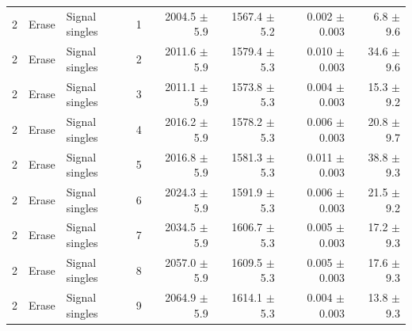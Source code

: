 \begin{tabular}{llllrrrr}
\midrule
2 & Erase & Signal singles & 1 & 2004.5 \ensuremath{\pm} 5.9 & 1567.4 \ensuremath{\pm} 5.2 & 0.002 \ensuremath{\pm} 0.003 & 6.8 \ensuremath{\pm} 9.6 \\
2 & Erase & Signal singles & 2 & 2011.6 \ensuremath{\pm} 5.9 & 1579.4 \ensuremath{\pm} 5.3 & 0.010 \ensuremath{\pm} 0.003 & 34.6 \ensuremath{\pm} 9.6 \\
2 & Erase & Signal singles & 3 & 2011.1 \ensuremath{\pm} 5.9 & 1573.8 \ensuremath{\pm} 5.3 & 0.004 \ensuremath{\pm} 0.003 & 15.3 \ensuremath{\pm} 9.2 \\
2 & Erase & Signal singles & 4 & 2016.2 \ensuremath{\pm} 5.9 & 1578.2 \ensuremath{\pm} 5.3 & 0.006 \ensuremath{\pm} 0.003 & 20.8 \ensuremath{\pm} 9.7 \\
2 & Erase & Signal singles & 5 & 2016.8 \ensuremath{\pm} 5.9 & 1581.3 \ensuremath{\pm} 5.3 & 0.011 \ensuremath{\pm} 0.003 & 38.8 \ensuremath{\pm} 9.3 \\
2 & Erase & Signal singles & 6 & 2024.3 \ensuremath{\pm} 5.9 & 1591.9 \ensuremath{\pm} 5.3 & 0.006 \ensuremath{\pm} 0.003 & 21.5 \ensuremath{\pm} 9.2 \\
2 & Erase & Signal singles & 7 & 2034.5 \ensuremath{\pm} 5.9 & 1606.7 \ensuremath{\pm} 5.3 & 0.005 \ensuremath{\pm} 0.003 & 17.2 \ensuremath{\pm} 9.3 \\
2 & Erase & Signal singles & 8 & 2057.0 \ensuremath{\pm} 5.9 & 1609.5 \ensuremath{\pm} 5.3 & 0.005 \ensuremath{\pm} 0.003 & 17.6 \ensuremath{\pm} 9.3 \\
2 & Erase & Signal singles & 9 & 2064.9 \ensuremath{\pm} 5.9 & 1614.1 \ensuremath{\pm} 5.3 & 0.004 \ensuremath{\pm} 0.003 & 13.8 \ensuremath{\pm} 9.3 \\
\bottomrule
\end{tabular}
